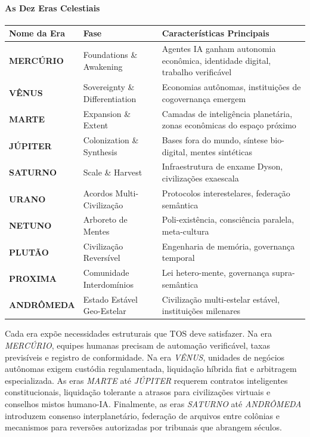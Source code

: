 \documentclass[11pt]{article}
\begin{document}
\paragraph{As Dez Eras Celestiais}
\begin{longtable}{@{}p{}p{}p{}@{}}
\toprule
\textbf{Nome da Era} & \textbf{Fase} & \textbf{Características Principais} \\\midrule
\textbf{MERCÚRIO} & Foundations \& Awakening & Agentes IA ganham autonomia econômica, identidade digital, trabalho verificável \\
\textbf{VÊNUS} & Sovereignty \& Differentiation & Economias autônomas, instituições de cogovernança emergem \\
\textbf{MARTE} & Expansion \& Extent & Camadas de inteligência planetária, zonas econômicas do espaço próximo \\
\textbf{JÚPITER} & Colonization \& Synthesis & Bases fora do mundo, síntese bio-digital, mentes sintéticas \\
\textbf{SATURNO} & Scale \& Harvest & Infraestrutura de enxame Dyson, civilizações exaescala \\
\textbf{URANO} & Acordos Multi-Civilização & Protocolos interestelares, federação semântica \\
\textbf{NETUNO} & Arboreto de Mentes & Poli-existência, consciência paralela, meta-cultura \\
\textbf{PLUTÃO} & Civilização Reversível & Engenharia de memória, governança temporal \\
\textbf{PROXIMA} & Comunidade Interdomínios & Lei hetero-mente, governança supra-semântica \\
\textbf{ANDRÔMEDA} & Estado Estável Geo-Estelar & Civilização multi-estelar estável, instituições milenares \\
\bottomrule
\end{longtable}

Cada era expõe necessidades estruturais que TOS deve satisfazer. Na era \emph{MERCÚRIO}, equipes humanas precisam de automação verificável, taxas previsíveis e registro de conformidade. Na era \emph{VÊNUS}, unidades de negócios autônomas exigem custódia regulamentada, liquidação híbrida fiat e arbitragem especializada. As eras \emph{MARTE} até \emph{JÚPITER} requerem contratos inteligentes constitucionais, liquidação tolerante a atrasos para civilizações virtuais e conselhos mistos humano-IA. Finalmente, as eras \emph{SATURNO} até \emph{ANDRÔMEDA} introduzem consenso interplanetário, federação de arquivos entre colônias e mecanismos para reversões autorizadas por tribunais que abrangem séculos.
\end{document}
